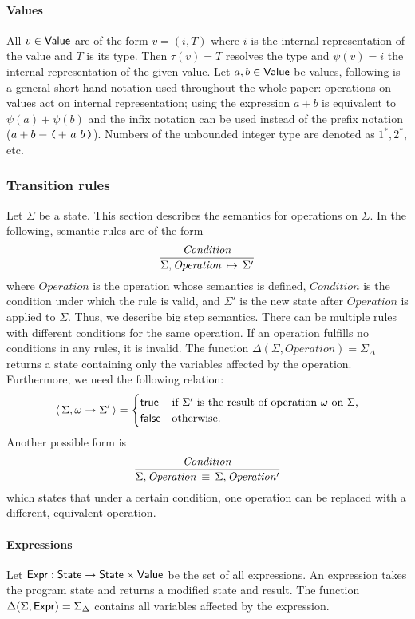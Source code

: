 \paragraph{Values}
All $v \in \mathsf{Value}$ are of the form $v = (i, T)$ where $i$ is the internal representation of the value and $T$ is its type.
Then $\tau(v) = T$ resolves the type and $\psi(v) = i$ the internal representation of the given value.
Let $a, b \in \mathsf{Value}$ be values, following is a general short-hand notation used throughout the whole paper: operations on values act on internal representation;
using the expression $a + b$ is equivalent to $\psi(a) + \psi(b)$ and the infix notation can be used instead of the prefix notation ($a + b \equiv \opexp{+}{a}{b}$).
Numbers of the unbounded integer type are denoted as $1^*, 2^*$, etc.

\subsubsection{Transition rules}
Let $\Sigma$ be a state.
This section describes the semantics for operations on $\Sigma$.
In the following, semantic rules are of the form
	$$\frac{\mathit{Condition}}{{\Sigma, \mathit{Operation}} \,\mapsto\, \Sigma'}$$
	where
		$\mathit{Operation}$ is the operation whose semantics is defined,
		$\mathit{Condition}$ is the condition under which the rule is valid, and
		$\Sigma'$ is the new state after $\mathit{Operation}$ is applied to $\Sigma$.
Thus, we describe big step semantics.
There can be multiple rules with different conditions for the same operation.
If an operation fulfills no conditions in any rules, it is invalid.
The function $\Delta(\Sigma, \mathit{Operation}) = \Sigma_\Delta$ returns a state containing only the variables affected by the operation.
Furthermore, we need the following relation:
$$\left\langle\, \Sigma, \omega \to \Sigma' \,\right\rangle = \begin{cases}
	\mathsf{true} & \text{if $\Sigma'$ is the result of operation $\omega$ on $\Sigma$,} \\
	\mathsf{false} & \text{otherwise.}
\end{cases}
$$
Another possible form is
$$
\frac{\mathit{Condition}}{\Sigma, \mathit{Operation} \,\equiv\, \Sigma, \mathit{Operation'}}
$$
which states that under a certain condition, one operation can be replaced with a different, equivalent operation.

\paragraph{Expressions}
Let $\mathsf{Expr}: \mathsf{State} \to \mathsf{State} \times \mathsf{Value}$ be the set of all expressions.
An expression takes the program state and returns a modified state and result.
The function $\Delta(\Sigma, \mathsf{Expr}) = \Sigma_{\Delta}$ contains all variables affected by the expression.

